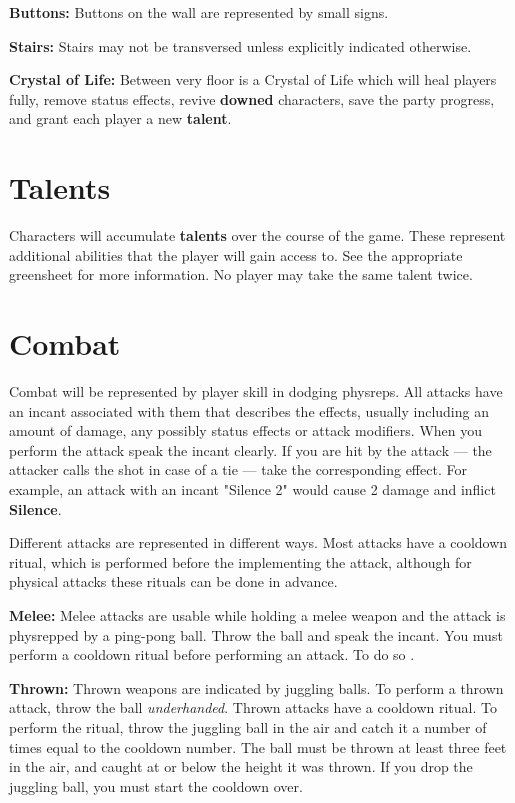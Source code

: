 \documentclass[green]{grimrock}
\begin{document}
{\bf Buttons:} Buttons on the wall are represented by small signs.

{\bf Stairs:} Stairs may not be transversed unless explicitly indicated otherwise.

{\bf Crystal of Life:}  Between very floor is a Crystal of Life which will heal players fully, remove status effects, revive {\bf downed} characters, save the party progress, and grant each player a new {\bf talent}.

\section{Talents}

Characters will accumulate {\bf talents} over the course of the game.  These represent additional abilities that the player will gain access to.  See the appropriate greensheet for more information.  No player may take the same talent twice.

\section{Combat}

Combat will be represented by player skill in dodging physreps.  All attacks have an incant associated with them that describes the effects, usually including an amount of damage, any possibly status effects or attack modifiers.  When you perform the attack speak the incant clearly.  If you are hit by the attack --- the attacker calls the shot in case of a tie --- take the corresponding effect.  For example, an attack with an incant "Silence 2" would cause 2 damage and inflict {\bf Silence}.

Different attacks are represented in different ways.  Most attacks have a cooldown ritual, which is performed before the implementing the attack, although for physical attacks these rituals can be done in advance.

{\bf Melee:} Melee attacks are usable while holding a melee weapon and the attack is physrepped by a ping-pong ball.  Throw the ball and speak the incant.  You must perform a cooldown ritual before performing an attack.  To do so .

{\bf Thrown:}  Thrown weapons are indicated by juggling balls.  To perform a thrown attack, throw the ball \emph{underhanded}.  Thrown attacks have a cooldown ritual.  To perform the ritual, throw the juggling ball in the air and catch it a number of times equal to the cooldown number.  The ball must be thrown at least three feet in the air, and caught at or below the height it was thrown.  If you drop the juggling ball, you must start the cooldown over.
\end{document}
